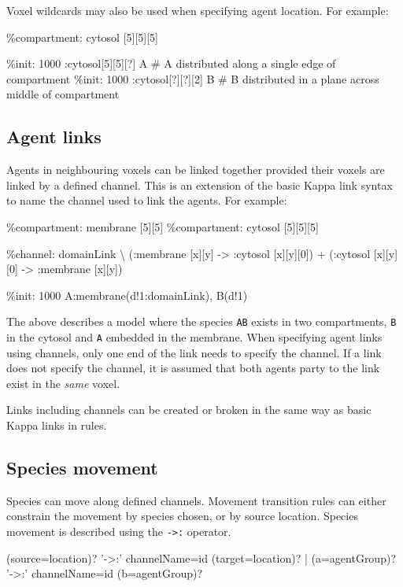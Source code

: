\documentclass[english]{report}
\begin{document}
Voxel wildcards may also be used when specifying agent location. For example:

\begin{kappasource}
\%compartment: cytosol [5][5][5]

\%init: 1000 :cytosol[5][5][?] A # A distributed along a single edge of compartment
\%init: 1000 :cytosol[?][?][2] B # B distributed in a plane across middle of compartment
\end{kappasource}


\subsection{Agent links}

Agents in neighbouring voxels can be linked together provided their voxels are linked by a defined channel. This is an extension of the basic Kappa link syntax to name the channel used to link the agents. For example:

\begin{kappasource}
\%compartment: membrane [5][5]
\%compartment: cytosol  [5][5][5]

\%channel: domainLink {\textbackslash}
    (:membrane [x][y] -> :cytosol [x][y][0]) + (:cytosol [x][y][0] -> :membrane [x][y])

\%init: 1000 A:membrane(d!1:domainLink), B(d!1)
\end{kappasource}

The above describes a model where the species \Verb+AB+ exists in two compartments, \Verb+B+ in the cytosol and \Verb+A+ embedded in the membrane. When specifying agent links using channels, only one end of the link needs to specify the channel. If a link does not specify the channel, it is assumed that both agents party to the link exist in the \emph{same} voxel.

Links including channels can be created or broken in the same way as basic Kappa links in  rules.

\subsection{Species movement}

Species can move along defined channels. Movement transition rules can either constrain the movement by species chosen, or by source location.  Species movement is described using the \verb|->:| operator. 

\begin{bnfsource}
(source=location)? '->:' channelName=id (target=location)?
|  (a=agentGroup)? '->:' channelName=id (b=agentGroup)?
\end{bnfsource}
\end{document}
